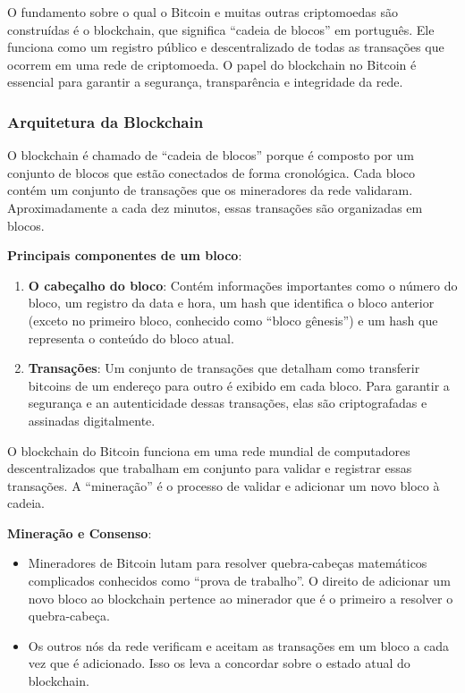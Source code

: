 \documentclass[a4paper,12pt]{article}
\begin{document}
\hspace{0.5cm}O fundamento sobre o qual o Bitcoin e muitas outras criptomoedas são construídas 
é o blockchain, que significa ``cadeia de blocos'' em português. Ele funciona como um registro 
público e descentralizado de todas as transações que ocorrem em uma rede de criptomoeda. 
O papel do blockchain no Bitcoin é essencial para garantir a segurança, transparência e 
integridade da rede.

\subsubsection{Arquitetura da Blockchain}
\hspace{0.5cm}O blockchain é chamado de ``cadeia de blocos'' porque é composto por um conjunto 
de blocos que estão conectados de forma cronológica. Cada bloco contém um conjunto de transações que 
os mineradores da rede validaram. Aproximadamente a cada dez minutos, essas transações são organizadas 
em blocos.

\textbf{Principais componentes de um bloco}: 

\begin{enumerate}
\item \textbf{O cabeçalho do bloco}: Contém informações importantes como o número do bloco, 
um registro da data e hora, um hash que identifica o bloco anterior (exceto no primeiro bloco, conhecido como 
``bloco gênesis'') e um hash que representa o conteúdo do bloco atual.

\item \textbf{Transações}: Um conjunto de transações que detalham como transferir bitcoins de um 
endereço para outro é exibido em cada bloco. Para garantir a segurança e an autenticidade dessas 
transações, elas são criptografadas e assinadas digitalmente.
\end{enumerate}

O blockchain do Bitcoin funciona em uma rede mundial de computadores descentralizados que 
trabalham em conjunto para validar e registrar essas transações. A ``mineração'' é o processo 
de validar e adicionar um novo bloco à cadeia.

\textbf{Mineração e Consenso}: 

\begin{itemize}
\item Mineradores de Bitcoin lutam para resolver quebra-cabeças matemáticos complicados conhecidos como 
``prova de trabalho''. O direito de adicionar um novo bloco ao blockchain pertence ao minerador que é o 
primeiro a resolver o quebra-cabeça.

\item Os outros nós da rede verificam e aceitam as transações em um bloco a cada vez que é adicionado. 
Isso os leva a concordar sobre o estado atual do blockchain.
\end{itemize}
\end{document}
